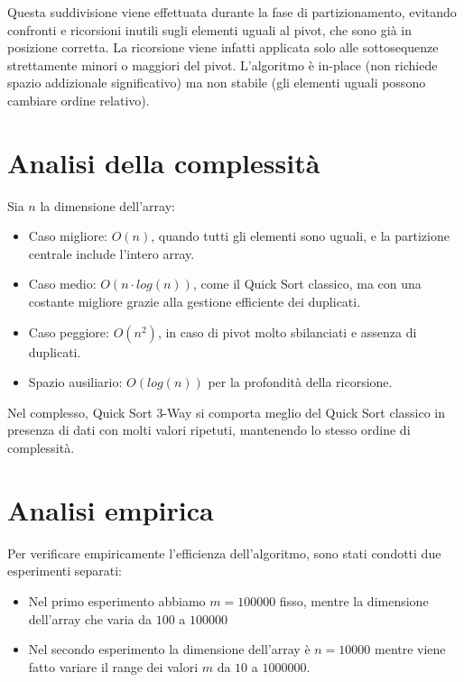 \documentclass[a4paper, 12pt, oneside]{book}
\begin{document}
\noindent Questa suddivisione viene effettuata durante la fase di partizionamento, evitando confronti e ricorsioni inutili sugli elementi uguali al pivot, che sono già in posizione corretta. La ricorsione viene infatti applicata solo alle sottosequenze strettamente minori o maggiori del pivot.
L'algoritmo è in-place (non richiede spazio addizionale significativo) ma non stabile (gli elementi uguali possono cambiare ordine relativo).

\section{Analisi della complessità}

Sia \(n\) la dimensione dell'array:

\begin{itemize}
    \item Caso migliore: \(O(n)\), quando tutti gli elementi sono uguali, e la partizione centrale include l'intero array.
    \item Caso medio: \(O(n \cdot log(n))\), come il Quick Sort classico, ma con una costante migliore grazie alla gestione efficiente dei duplicati.
    \item Caso peggiore: \(O(n^2)\), in caso di pivot molto sbilanciati e assenza di duplicati.
    \item Spazio ausiliario: \(O(log(n))\) per la profondità della ricorsione.
\end{itemize}

\noindent Nel complesso, Quick Sort 3-Way si comporta meglio del Quick Sort classico in presenza di dati con molti valori ripetuti, mantenendo lo stesso ordine di complessità.

\section{Analisi empirica}

Per verificare empiricamente l'efficienza dell'algoritmo, sono stati condotti due esperimenti separati:

\begin{itemize}
    \item Nel primo esperimento abbiamo \(m = 100000\) fisso, mentre la dimensione dell'array che varia da \(100\) a $100000$
    \item Nel secondo esperimento la dimensione dell'array è \(n = 10000\) mentre viene fatto variare il range dei valori \(m\) da $10$ a $1000000$.
\end{itemize}
\end{document}
